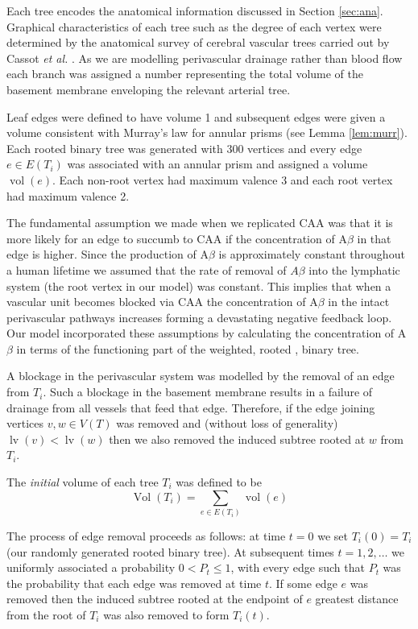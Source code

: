 \documentclass[10pt]{amsart} %
\theoremstyle{definition}
\DeclareMathOperator{\vol}{vol}
\DeclareMathOperator{\Vol}{Vol}
\DeclareMathOperator{\lv}{lv}
\begin{document}
Each tree encodes the anatomical information discussed in Section \ref{sec:ana}. Graphical characteristics of each tree such 
as the degree of each vertex were determined by the anatomical survey of cerebral vascular trees carried out by Cassot 
\emph{et al.} \cite{Cassot}.  As we are modelling perivascular drainage rather than blood flow each branch was 
assigned a number representing the total volume of the basement membrane enveloping the relevant arterial tree.   

Leaf  edges were defined to have volume 1 and subsequent edges were given a volume 
consistent with Murray's law for annular prisms (see Lemma \ref{lem:murr}).  Each rooted binary tree was generated with $300$
vertices and every edge $e \in E(T_i)$ was associated with an annular prism 
and assigned a volume $\vol(e)$.  Each non-root vertex had maximum valence 3 and each root vertex had maximum valence 2.  

The fundamental assumption we made when we replicated CAA was that it is more likely for an edge to succumb to CAA if the concentration of A$\beta$ in that edge is higher.  Since the production of A$\beta$ is approximately constant throughout a human lifetime \cite{wellerperi} we assumed that the rate of removal of $A\beta$ into the lymphatic system (the root vertex in our model) was constant. This implies that when a vascular unit becomes blocked via CAA the concentration of A$\beta$ in the intact perivascular pathways increases forming a devastating negative feedback loop.  Our model incorporated these assumptions by calculating the concentration of A$\beta$ in terms of the functioning part of the weighted, rooted , binary tree. 

A blockage in the perivascular system was modelled by the removal of an edge from $T_i$.  Such a blockage in the basement membrane results in a failure of drainage from all vessels that feed that edge. Therefore, if the edge joining vertices $v,w \in V(T)$ was removed and (without loss of generality) $\lv(v) < \lv(w)$ then we also removed the induced subtree rooted at $w$ from $T_i$.     
    

The \emph{initial} volume of each tree $T_i$ was defined to be 
\[\Vol(T_i) =  \sum_{e \in E(T_i)} \vol(e)\]
 
The process of edge removal proceeds as follows:  at time $t=0$ we set $T_{i}(0) = T_{i}$ (our randomly generated rooted binary
tree).  At subsequent times  $t = 1,2,\dots$ we uniformly associated a probability $0<P_{t}\leq 1$,
with every edge such that $P_t$ was the probability that each edge was removed at time $t$. If some edge $e$ was removed then
the induced subtree rooted at the endpoint of $e$ greatest distance from the root of $T_i$ was also removed to form $T_i(t)$.   
\end{document}
